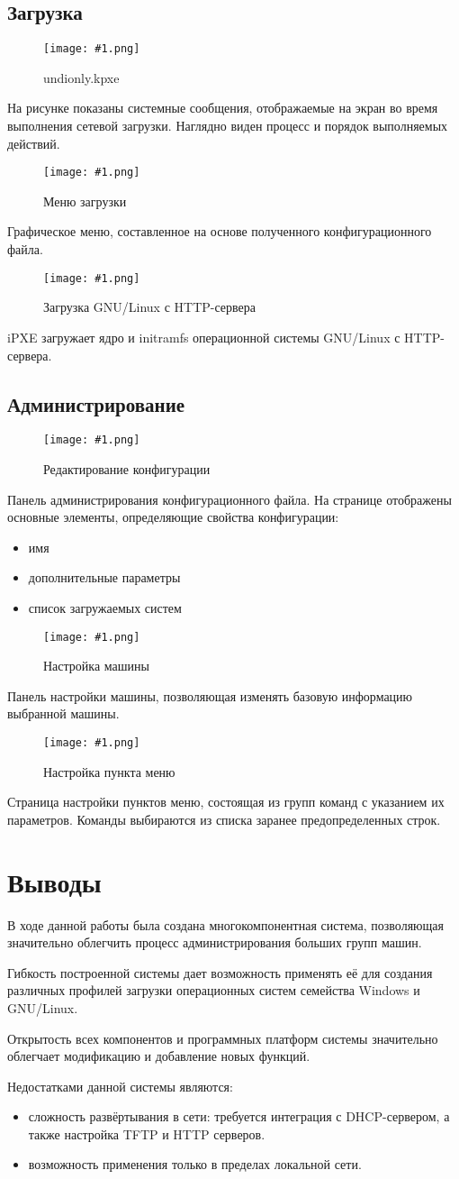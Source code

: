 \documentclass[11pt]{article}
\newcommand{\includepicture}[3]{
\begin{figure}[H]
\begin{center}
\leavevmode
\texttt{[image: \#1.png]}
\end{center}
\caption{#2}
\end{figure}
}
\begin{document}

\subsection{Загрузка}
\includepicture{ipxe}{undionly.kpxe}{1}
На рисунке показаны системные сообщения, отображаемые на экран во время выполнения сетевой загрузки.
Наглядно виден процесс и порядок выполняемых действий.
\newpage

\includepicture{menu}{Меню загрузки}{1}
Графическое меню, составленное на основе полученного конфигурационного файла.
\newpage

\includepicture{fetch}{Загрузка GNU/Linux с HTTP-сервера}{1}
iPXE загружает ядро и initramfs операционной системы GNU/Linux с HTTP-сервера.
\newpage

\subsection{Администрирование}
\includepicture{adm_config}{Редактирование конфигурации}{1}
Панель администрирования конфигурационного файла.
На странице отображены основные элементы, определяющие свойства конфигурации:
\begin{itemize}
    \item имя
    \item дополнительные параметры
    \item список загружаемых систем
\end{itemize}
\newpage

\includepicture{adm_machine}{Настройка машины}{1}
Панель настройки машины, позволяющая изменять базовую информацию выбранной машины.
\newpage

\includepicture{adm_menuitem}{Настройка пункта меню}{1}
Страница настройки пунктов меню, состоящая из групп команд с указанием их параметров.
Команды выбираются из списка заранее предопределенных строк.
\newpage

\section{Выводы}
В ходе данной работы была создана многокомпонентная система,
позволяющая значительно облегчить процесс администрирования больших групп машин.

Гибкость построенной системы дает возможность применять её для создания различных
профилей загрузки операционных систем семейства Windows и GNU/Linux.

Открытость всех компонентов и программных платформ системы
значительно облегчает модификацию и добавление новых функций.

Недостатками данной системы являются:
\begin{itemize}
    \item сложность развёртывания в сети: требуется интеграция с DHCP-сервером, а также настройка TFTP и HTTP серверов.
    \item возможность применения только в пределах локальной сети.
\end{itemize}
\end{document}
